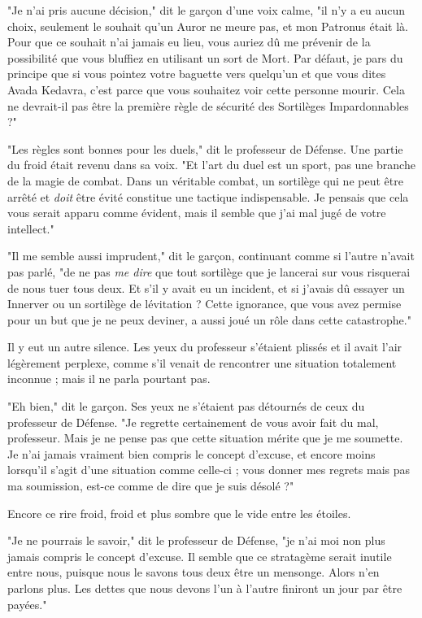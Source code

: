 "Je n'ai pris aucune décision," dit le garçon d'une voix calme, "il n'y a eu aucun choix, seulement le souhait qu'un Auror ne meure pas, et mon Patronus était là. Pour que ce souhait n'ai jamais eu lieu, vous auriez dû me prévenir de la possibilité que vous bluffiez en utilisant un sort de Mort. Par défaut, je pars du principe que si vous pointez votre baguette vers quelqu'un et que vous dites Avada Kedavra, c'est parce que vous souhaitez voir cette personne mourir. Cela ne devrait-il pas être la première règle de sécurité des Sortilèges Impardonnables ?"

"Les règles sont bonnes pour les duels," dit le professeur de Défense. Une partie du froid était revenu dans sa voix. "Et l'art du duel est un sport, pas une branche de la magie de combat. Dans un véritable combat, un sortilège qui ne peut être arrêté et \emph{doit}  être évité constitue une tactique indispensable. Je pensais que cela vous serait apparu comme évident, mais il semble que j'ai mal jugé de votre intellect."

"Il me semble aussi imprudent," dit le garçon, continuant comme si l'autre n'avait pas parlé, "de ne pas \emph{me dire}  que tout sortilège que je lancerai sur vous risquerai de nous tuer tous deux. Et s'il y avait eu un incident, et si j'avais dû essayer un Innerver ou un sortilège de lévitation ? Cette ignorance, que vous avez permise pour un but que je ne peux deviner, a aussi joué un rôle dans cette catastrophe."

Il y eut un autre silence. Les yeux du professeur s'étaient plissés et il avait l'air légèrement perplexe, comme s'il venait de rencontrer une situation totalement inconnue ; mais il ne parla pourtant pas.

"Eh bien," dit le garçon. Ses yeux ne s'étaient pas détournés de ceux du professeur de Défense. "Je regrette certainement de vous avoir fait du mal, professeur. Mais je ne pense pas que cette situation mérite que je me soumette. Je n'ai jamais vraiment bien compris le concept d'excuse, et encore moins lorsqu'il s'agit d'une situation comme celle-ci ; vous donner mes regrets mais pas ma soumission, est-ce comme de dire que je suis désolé ?"

Encore ce rire froid, froid et plus sombre que le vide entre les étoiles.

"Je ne pourrais le savoir," dit le professeur de Défense, "je n'ai moi non plus jamais compris le concept d'excuse. Il semble que ce stratagème serait inutile entre nous, puisque nous le savons tous deux être un mensonge. Alors n'en parlons plus. Les dettes que nous devons l'un à l'autre finiront un jour par être payées."

